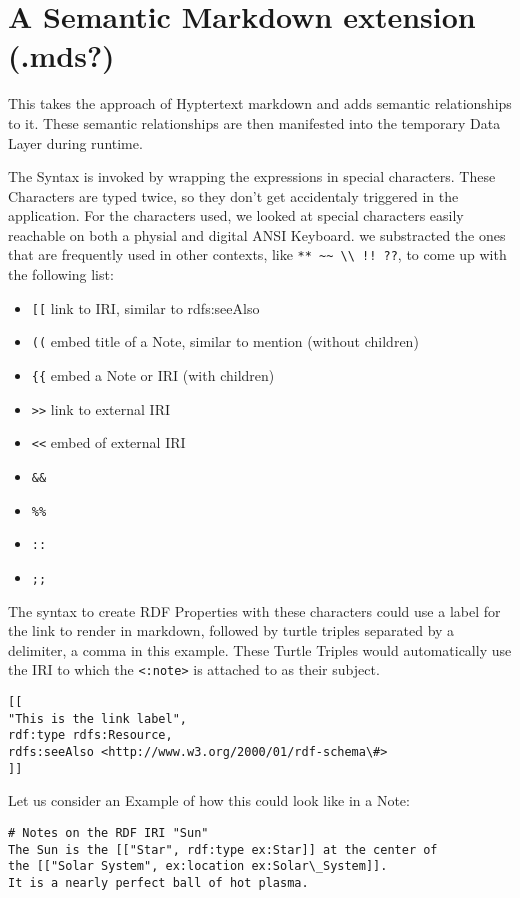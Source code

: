 \section{A Semantic Markdown extension (.mds?)}

This takes the approach of Hyptertext markdown and adds semantic relationships to it. These semantic relationships are then manifested into the temporary Data Layer during runtime.

The Syntax is invoked by wrapping the expressions in special characters. These Characters are typed twice, so they don’t get accidentaly triggered in the application. For the characters used, we looked at special characters easily reachable on both a physial  and digital ANSI Keyboard. we substracted the ones that are frequently used in other contexts, like \verb|** ~~ \\ !! ??|, to come up with the following list:
\begin{itemize}
    \item \verb|[[| link to IRI, similar to rdfs:seeAlso
    \item \verb|((| embed title of a Note, similar to mention (without children)
    \item \verb|{{| embed a Note or IRI (with children)
    \item \verb|>>| link to external IRI
    \item \verb|<<| embed of external IRI
    \item \verb|&&|
    \item \verb|%%|
    \item \verb|::|
    \item \verb|;;|
\end{itemize}

The syntax  to create RDF Properties with these characters could use a label for the link to render  in markdown, followed by turtle triples separated by a delimiter, a comma in this example. These Turtle Triples would automatically use the IRI to which the \verb|<:note>| is attached to as their subject.

\begin{verbatim}
[[
"This is the link label", 
rdf:type rdfs:Resource, 
rdfs:seeAlso <http://www.w3.org/2000/01/rdf-schema\#>
]]
\end{verbatim}

Let us consider an Example of how this could look like in a Note:
\begin{verbatim}
# Notes on the RDF IRI "Sun"
The Sun is the [["Star", rdf:type ex:Star]] at the center of 
the [["Solar System", ex:location ex:Solar\_System]]. 
It is a nearly perfect ball of hot plasma.
\end{verbatim}


